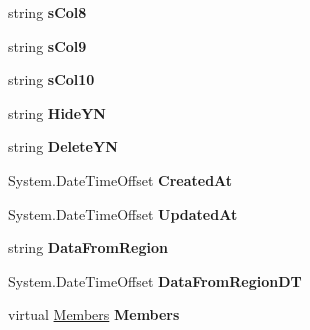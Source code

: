 \begin{DoxyCompactItemize}
\item 
string {\bfseries s\+Col8}\hypertarget{a00139_ae164413a6e6caa3e41e4f854019296ff}{}\label{a00139_ae164413a6e6caa3e41e4f854019296ff}

\item 
string {\bfseries s\+Col9}\hypertarget{a00139_a78a0487510c100c3b5276fc535c01304}{}\label{a00139_a78a0487510c100c3b5276fc535c01304}

\item 
string {\bfseries s\+Col10}\hypertarget{a00139_a2ea9105547391784d95ecfe791985cca}{}\label{a00139_a2ea9105547391784d95ecfe791985cca}

\item 
string {\bfseries Hide\+YN}\hypertarget{a00139_a63a12f3e1e3cd58aef0098054149db17}{}\label{a00139_a63a12f3e1e3cd58aef0098054149db17}

\item 
string {\bfseries Delete\+YN}\hypertarget{a00139_a0fbeeb1c629961bd06bfd60560349672}{}\label{a00139_a0fbeeb1c629961bd06bfd60560349672}

\item 
System.\+Date\+Time\+Offset {\bfseries Created\+At}\hypertarget{a00139_a1615dc483d996bba1210ea0a8e6de497}{}\label{a00139_a1615dc483d996bba1210ea0a8e6de497}

\item 
System.\+Date\+Time\+Offset {\bfseries Updated\+At}\hypertarget{a00139_a55883db2ce203b7765ec9c524c6f5e43}{}\label{a00139_a55883db2ce203b7765ec9c524c6f5e43}

\item 
string {\bfseries Data\+From\+Region}\hypertarget{a00139_ac70211b06957cec91d91f9ff46d140ed}{}\label{a00139_ac70211b06957cec91d91f9ff46d140ed}

\item 
System.\+Date\+Time\+Offset {\bfseries Data\+From\+Region\+DT}\hypertarget{a00139_a75b9c7b5861f8bcb52f19991baf1a9e9}{}\label{a00139_a75b9c7b5861f8bcb52f19991baf1a9e9}

\item 
virtual \hyperlink{a00145}{Members} {\bfseries Members}\hypertarget{a00139_ac2f90c3f6dc24b7f775cff742d2e286e}{}\label{a00139_ac2f90c3f6dc24b7f775cff742d2e286e}

\end{DoxyCompactItemize}


